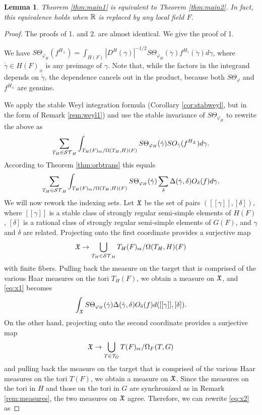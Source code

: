 \documentclass{article}
\newtheorem{lem}[thm]{Lemma}
\theoremstyle{definition}
\numberwithin{equation}{section}
\renewcommand{\-}{\hyp{}}
\begin{document}
\begin{lem}
Theorem \ref{thm:main1} is equivalent to Theorem \ref{thm:main2}. In fact, this equivalence holds when $\mathbb{R}$ is replaced by any local field $F$.
\end{lem}
\begin{proof}
The proofs of 1. and 2. are almost identical. We give the proof of 1. 

We have $S\Theta_{\varphi_H}(f^{H_\pm}) = \int_{H(F)}|D^H(\gamma)|^{-1/2}S\Theta_{\varphi_H}(\dot\gamma)f^{H_1}(\dot\gamma)d\gamma$, where $\dot\gamma \in H(F)_\pm$ is any preimage of $\gamma$. Note that, while the factors in the integrand depends on $\dot\gamma$, the dependence cancels out in the product, because both $S\Theta_\varphi$ and $f^{H_\pm}$ are genuine.

We apply the stable Weyl integration formula (Corollary \ref{cor:stabweyl}, but in the form of Remark \ref{rem:weyl1}) and use the stable invariance of $S\Theta_{\varphi_H}$ to rewrite the above as
\[ \sum_{T_H \in \mathcal{ST}_H} \int_{T_H(F)_{\textrm{sr}}/\Omega(T_H,H)(F)}S\Theta_{\varphi_H}(\dot\gamma) SO_{\dot\gamma}(f^{H_\pm})d\gamma.\]
According to Theorem \ref{thm:orbtrans} this equals
\begin{equation} \label{eq:x1}
\sum_{T_H \in \mathcal{ST}_H} \int_{T_H(F)_{\textrm{sr}}/\Omega(T_H,H)(F)}S\Theta_{\varphi_H}(\dot\gamma)  \sum_\delta \Delta(\dot\gamma,\delta) O_\delta(f) d\gamma.
\end{equation}
We will now rework the indexing sets. Let $\mathfrak{X}$ be the set of pairs $([[\gamma]],[\delta])$, where $[[\gamma]]$ is a stable class of strongly regular semi-simple elements of $H(F)$, $[\delta]$ is a rational class of strongly regular semi-simple elements of $G(F)$, and $\gamma$ and $\delta$ are related. Projecting onto the first coordinate provides a surjective map
\[ \mathfrak{X} \to \bigcup_{T_H \in \mathcal{ST}_H} T_H(F)_{\textrm{sr}}/\Omega(T_H,H)(F) \]
with finite fibers. Pulling back the measure on the target that is comprised of the various Haar measures on the tori $T_H(F)$, we obtain a measure on $\mathfrak{X}$, and \eqref{eq:x1} becomes
\begin{equation} \label{eq:x2}
\int_{\mathfrak{X}} S\Theta_{\varphi_H}(\dot\gamma) \Delta(\dot\gamma,\delta) O_\delta(f) d([[\gamma]],[\delta]).
\end{equation}
On the other hand, projecting onto the second coordinate provides a surjective map
\[ \mathfrak{X} \to \bigcup_{T \in \mathcal{T}_G} T(F)_{\textrm{sr}}/\Omega_F(T,G) \]
and pulling back the measure on the target that is comprised of the various Haar measures on the tori $T(F)$, we obtain a measure on $\mathfrak{X}$. Since the measures on the tori in $H$ and those on the tori in $G$ are synchronized as in Remark \ref{rem:measures}, the two measures on $\mathfrak{X}$ agree. Therefore, we can rewrite \eqref{eq:x2} as 

\end{proof}
\end{document}
